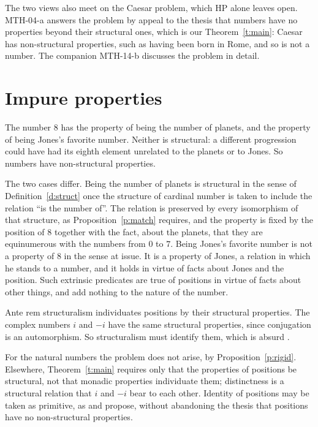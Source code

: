 \documentclass{situationist-preprint}
\begin{document}
The two views also meet on the Caesar problem, which HP alone leaves open. MTH-04-a answers the problem by appeal to the thesis that numbers have no properties beyond their structural ones, which is our Theorem~\ref{t:main}: Caesar has non-structural properties, such as having been born in Rome, and so is not a number. The companion MTH-14-b discusses the problem in detail.

\section{Impure properties}\label{s:impure}

\begin{objection}
The number $8$ has the property of being the number of planets, and the property of being Jones's favorite number. Neither is structural: a different progression could have had its eighth element unrelated to the planets or to Jones. So numbers have non-structural properties.
\end{objection}

\begin{reply}
The two cases differ. Being the number of planets is structural in the sense of Definition~\ref{d:struct} once the structure of cardinal number is taken to include the relation \enquote{is the number of}. The relation is preserved by every isomorphism of that structure, as Proposition~\ref{p:match} requires, and the property is fixed by the position of $8$ together with the fact, about the planets, that they are equinumerous with the numbers from $0$ to $7$. Being Jones's favorite number is not a property of $8$ in the sense at issue. It is a property of Jones, a relation in which he stands to a number, and it holds in virtue of facts about Jones and the position. Such extrinsic predicates are true of positions in virtue of facts about other things, and add nothing to the nature of the number.
\end{reply}

\begin{objection}
Ante rem structuralism individuates positions by their structural properties. The complex numbers $i$ and $-i$ have the same structural properties, since conjugation is an automorphism. So structuralism must identify them, which is absurd \citep{Burgess1999,Keranen2001}.
\end{objection}

\begin{reply}
For the natural numbers the problem does not arise, by Proposition~\ref{p:rigid}. Elsewhere, Theorem~\ref{t:main} requires only that the properties of positions be structural, not that monadic properties individuate them; distinctness is a structural relation that $i$ and $-i$ bear to each other. Identity of positions may be taken as primitive, as \citet{Ladyman2005} and \citet{LeitgebLadyman2008} propose, without abandoning the thesis that positions have no non-structural properties.
\end{reply}
\end{document}
